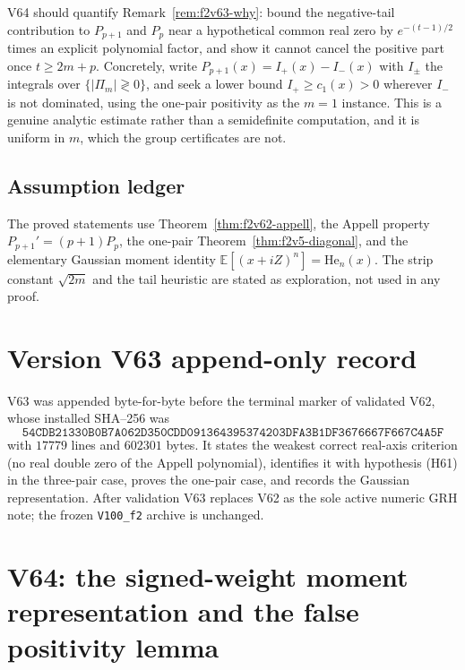 \documentclass[11pt]{article}
\theoremstyle{definition}
\theoremstyle{remark}
\begin{document}
V64 should quantify Remark~\ref{rem:f2v63-why}: bound the negative-tail
contribution to \(P_{p+1}\) and \(P_p\) near a hypothetical common real
zero by \(e^{-(t-1)/2}\) times an explicit polynomial factor, and show it
cannot cancel the positive part once \(t\ge2m+p\).  Concretely, write
\(P_{p+1}(x)=I_+(x)-I_-(x)\) with \(I_\pm\) the integrals over
\(\{|\Pi_m|\gtrless0\}\), and seek a lower bound
\(I_+\ge c_1(x)>0\) wherever \(I_-\) is not dominated, using the
one-pair positivity as the \(m=1\) instance.  This is a genuine analytic
estimate rather than a semidefinite computation, and it is uniform in
\(m\), which the group certificates are not.

\subsection*{Assumption ledger}
\label{ass:f2v63}
The proved statements use Theorem~\ref{thm:f2v62-appell}, the Appell
property \(P_{p+1}'=(p+1)P_p\), the one-pair
Theorem~\ref{thm:f2v5-diagonal}, and the elementary Gaussian moment
identity \(\mathbb E[(x+iZ)^n]=\mathrm{He}_n(x)\).  The strip constant
\(\sqrt{2m}\) and the tail heuristic are stated as exploration, not used
in any proof.
\endgroup

\section*{Version V63 append-only record}

V63 was appended byte-for-byte before the terminal marker of validated
V62, whose installed SHA--256 was
\[
 \texttt{54CDB21330B0B7A062D350CDD0913643}
 \allowbreak\texttt{95374203DFA3B1DF3676667F667C4A5F}
\]
with \(17779\) lines and \(602301\) bytes.  It states the weakest correct
real-axis criterion (no real double zero of the Appell polynomial),
identifies it with hypothesis (H61) in the three-pair case, proves the
one-pair case, and records the Gaussian representation.  After validation
V63 replaces V62 as the sole active numeric GRH note; the frozen
\texttt{V100\_f2} archive is unchanged.





\clearpage
\section{V64: the signed-weight moment representation and the false positivity lemma}
\label{sec:f2v64-signed-weight}
\begingroup
\setcounter{equation}{0}
\renewcommand{\theequation}{N64.\arabic{equation}}
\renewcommand{\theHequation}{f2v64.\arabic{equation}}
\end{document}
